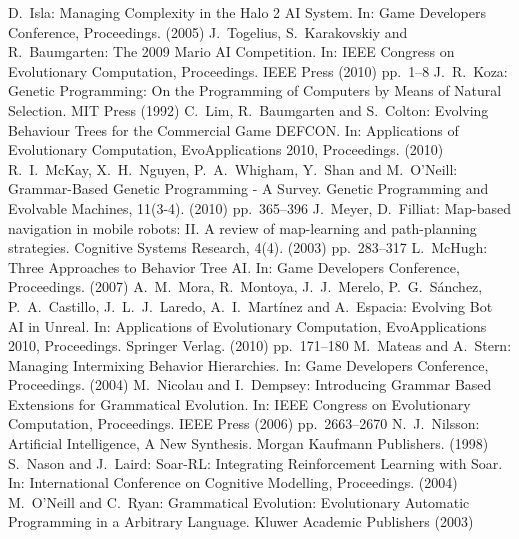 \documentclass[conference]{IEEEtran}
\begin{document}
\begin{thebibliography}{11}
	D.~Isla:
	Managing Complexity in the Halo 2 AI System.
	In: Game Developers Conference, Proceedings. (2005)
	J.~Togelius, S.~Karakovskiy and R.~Baumgarten:
	The 2009 Mario AI Competition.
	In: IEEE Congress on Evolutionary Computation, Proceedings.
	IEEE Press (2010)
	pp.~1--8
	J.~R.~Koza:
	Genetic Programming: On the Programming of Computers by Means of Natural Selection.
	MIT Press (1992)
	C.~Lim, R.~Baumgarten and S.~Colton:
	Evolving Behaviour Trees for the Commercial Game DEFCON.
	In: Applications of Evolutionary Computation, EvoApplications 2010, Proceedings. (2010)
	R.~I.~McKay, X.~H.~Nguyen, P.~A.~Whigham, Y.~Shan and M.~O'Neill:
	Grammar-Based Genetic Programming - A Survey.
	Genetic Programming and Evolvable Machines, 11(3-4). (2010)
	pp.~365--396
	J.~Meyer, D.~Filliat:
	Map-based navigation in mobile robots: II. A review of map-learning 
	and path-planning strategies.
	Cognitive Systems Research, 4(4). (2003)
	pp.~283--317
	L.~McHugh:
	Three Approaches to Behavior Tree AI.
	In: Game Developers Conference, Proceedings. (2007)
	A.~M.~Mora, R.~Montoya, J.~J.~Merelo, P.~G.~S\'anchez, P.~A.~Castillo,
	J.~L.~J.~Laredo, A.~I.~Mart\'inez and A.~Espacia:
	Evolving Bot AI in Unreal.
	In: Applications of Evolutionary Computation, EvoApplications 2010, Proceedings.
	Springer Verlag. (2010)
	pp.~171--180
	M.~Mateas and A.~Stern:
	Managing Intermixing Behavior Hierarchies.
	In: Game Developers Conference, Proceedings. (2004)
	M.~Nicolau and I.~Dempsey:
	Introducing Grammar Based Extensions for Grammatical Evolution.
	In: IEEE Congress on Evolutionary Computation, Proceedings.
	IEEE Press (2006)
	pp.~2663--2670
	N.~J.~Nilsson:
	Artificial Intelligence, A New Synthesis.
	Morgan Kaufmann Publishers. (1998)
	S.~Nason and J.~Laird:
	Soar-RL: Integrating Reinforcement Learning with Soar.
	In: International Conference on Cognitive Modelling, Proceedings. (2004)
	M.~O'Neill and C.~Ryan:
	Grammatical Evolution: Evolutionary Automatic Programming in a Arbitrary Language.
	Kluwer Academic Publishers (2003)

\end{thebibliography}
\end{document}
